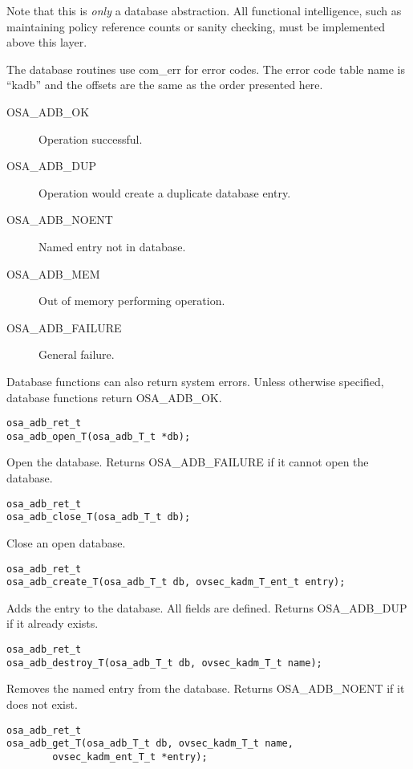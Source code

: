 Note that this is {\it only} a database abstraction.  All functional
intelligence, such as maintaining policy reference counts or sanity
checking, must be implemented above this layer.

The database routines use com_err for error codes.  The error code
table name is ``kadb'' and the offsets are the same as the order
presented here.

\begin{description}
\item[OSA_ADB_OK] Operation successful.
\item[OSA_ADB_DUP] Operation would create a duplicate database entry.
\item[OSA_ADB_NOENT] Named entry not in database.
\item[OSA_ADB_MEM] Out of memory performing operation.
\item[OSA_ADB_FAILURE] General failure.
\end{description}

Database functions can also return system errors.  Unless otherwise
specified, database functions return OSA_ADB_OK.

\begin{verbatim}
osa_adb_ret_t
osa_adb_open_T(osa_adb_T_t *db);
\end{verbatim}
%
Open the database.  Returns OSA_ADB_FAILURE if it cannot open the
database. 

\begin{verbatim}
osa_adb_ret_t
osa_adb_close_T(osa_adb_T_t db);
\end{verbatim}
%
Close an open database.

\begin{verbatim}
osa_adb_ret_t
osa_adb_create_T(osa_adb_T_t db, ovsec_kadm_T_ent_t entry);
\end{verbatim}
%
Adds the entry to the database.  All fields are defined.  Returns
OSA_ADB_DUP if it already exists.

\begin{verbatim}
osa_adb_ret_t
osa_adb_destroy_T(osa_adb_T_t db, ovsec_kadm_T_t name);
\end{verbatim}

Removes the named entry from the database.  Returns OSA_ADB_NOENT if
it does not exist.

\begin{verbatim}
osa_adb_ret_t
osa_adb_get_T(osa_adb_T_t db, ovsec_kadm_T_t name,
        ovsec_kadm_ent_T_t *entry); 
\end{verbatim}

